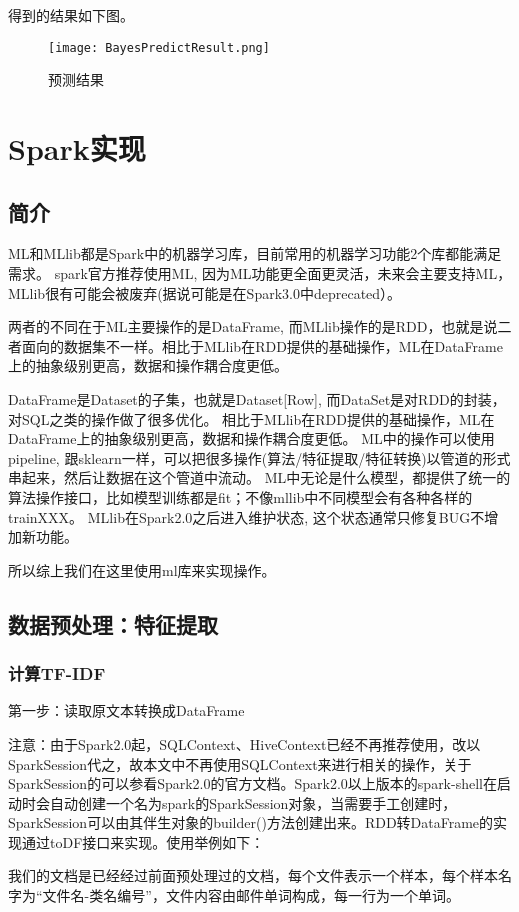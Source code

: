 \documentclass[lang=cn,11pt]{elegantpaper}
\begin{document}
得到的结果如下图。
\begin{figure}[htbp]
	\centering
	\texttt{[image: BayesPredictResult.png]}
	\caption{预测结果 \label{fig:BayesPredictResult}}
\end{figure}

\section{Spark实现}
\subsection{简介}
ML和MLlib都是Spark中的机器学习库，目前常用的机器学习功能2个库都能满足需求。
spark官方推荐使用ML, 因为ML功能更全面更灵活，未来会主要支持ML，MLlib很有可能会被废弃(据说可能是在Spark3.0中deprecated）。

两者的不同在于ML主要操作的是DataFrame, 而MLlib操作的是RDD，也就是说二者面向的数据集不一样。相比于MLlib在RDD提供的基础操作，ML在DataFrame上的抽象级别更高，数据和操作耦合度更低。

DataFrame是Dataset的子集，也就是Dataset[Row], 而DataSet是对RDD的封装，对SQL之类的操作做了很多优化。
相比于MLlib在RDD提供的基础操作，ML在DataFrame上的抽象级别更高，数据和操作耦合度更低。
ML中的操作可以使用pipeline, 跟sklearn一样，可以把很多操作(算法/特征提取/特征转换)以管道的形式串起来，然后让数据在这个管道中流动。
ML中无论是什么模型，都提供了统一的算法操作接口，比如模型训练都是fit；不像mllib中不同模型会有各种各样的trainXXX。
MLlib在Spark2.0之后进入维护状态, 这个状态通常只修复BUG不增加新功能。

所以综上我们在这里使用ml库来实现操作。
\subsection{数据预处理：特征提取}
\subsubsection{计算TF-IDF}
第一步：读取原文本转换成DataFrame

注意：由于Spark2.0起，SQLContext、HiveContext已经不再推荐使用，改以SparkSession代之，故本文中不再使用SQLContext来进行相关的操作，关于SparkSession的可以参看Spark2.0的官方文档。Spark2.0以上版本的spark-shell在启动时会自动创建一个名为spark的SparkSession对象，当需要手工创建时，SparkSession可以由其伴生对象的builder()方法创建出来。RDD转DataFrame的实现通过toDF接口来实现。使用举例如下：


我们的文档是已经经过前面预处理过的文档，每个文件表示一个样本，每个样本名字为“文件名-类名编号”，文件内容由邮件单词构成，每一行为一个单词。
\end{document}
